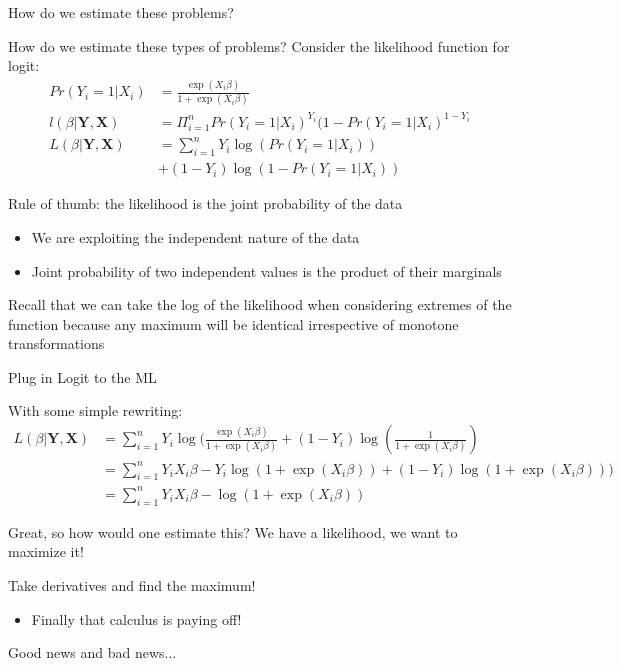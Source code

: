 \documentclass[notes,11pt, aspectratio=169]{beamer}
\newenvironment{wideitemize}{\itemize\addtolength{\itemsep}{10pt}}{\enditemize}
\begin{document}
  
  \begin{frame}{How do we estimate these problems?}
    \begin{wideitemize}
    \item     How do we estimate these types of problems? Consider the likelihood function for logit:
    \begin{align*}
      Pr(Y_{i} = 1 | X_{i} ) &= \frac{\exp(X_{i}\beta)}{1+\exp(X_{i}\beta)}\\
      l(\beta|\mathbf{Y}, \mathbf{X}) &= \Pi_{i=1}^{n} Pr(Y_{i} = 1 | X_{i} )^{Y_{i}}(1-Pr(Y_{i} = 1 | X_{i} )^{1-Y_{i}}\\
      L(\beta|\mathbf{Y}, \mathbf{X}) &= \sum_{i=1}^{n} Y_{i}\log(Pr(Y_{i} = 1 | X_{i} ))\\
                             &+  (1-Y_{i})\log(1-Pr(Y_{i} = 1 | X_{i} ))
    \end{align*}
  \item Rule of thumb: the likelihood is the joint probability of the data
    \begin{itemize}
    \item We are exploiting the independent nature of the data
    \item Joint probability of two independent values is the product
      of their marginals
    \end{itemize}
  \item Recall that we can take the log of the likelihood when
    considering extremes of the function because any maximum will be
    identical irrespective of monotone transformations
  \end{wideitemize}
  \end{frame}

  \begin{frame}{Plug in Logit to the ML}
    \begin{wideitemize}
      
    \item    With some simple rewriting:
    \begin{align*}
      L(\beta|\mathbf{Y}, \mathbf{X}) &= \sum_{i=1}^{n} Y_{i}\log(\frac{\exp(X_{i}\beta)}{1+\exp(X_{i}\beta)} +  (1-Y_{i})\log(\frac{1}{1+\exp(X_{i}\beta)})\\
      &= \sum_{i=1}^{n} Y_{i}X_{i}\beta - Y_{i}\log(1+\exp(X_{i}\beta)) +  (1-Y_{i})\log(1+\exp(X_{i}\beta)))\\
      &= \sum_{i=1}^{n} Y_{i}X_{i}\beta - \log(1+\exp(X_{i}\beta))
    \end{align*}
    \item Great, so how would one estimate this? We have a likelihood, we want to maximize it!

    \item  Take derivatives and find the maximum!
      \begin{itemize}
      \item Finally that calculus is paying off!
      \end{itemize}

    \item Good news and bad news... 
    \end{wideitemize}
  \end{frame}
\end{document}
